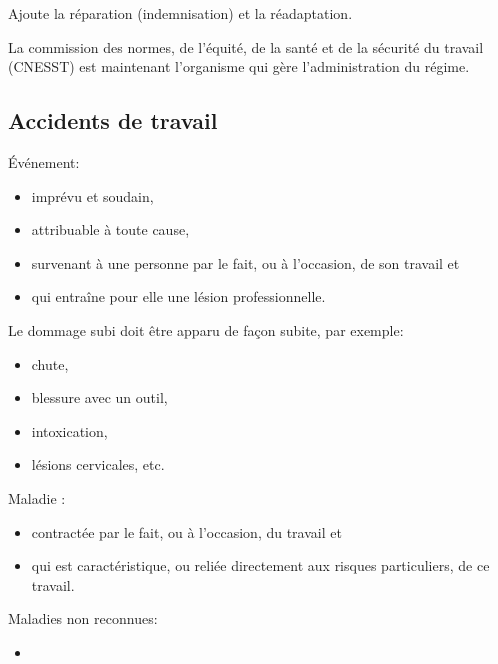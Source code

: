 \documentclass[10pt, french]{article}
\begin{document}
\begin{multicols*}{3}
\begin{rappel_enhanced}
Ajoute la réparation (indemnisation) et la réadaptation.
\end{rappel_enhanced}

La commission des normes, de l'équité, de la santé et de la sécurité du travail (CNESST) est maintenant l'organisme qui gère l'administration du régime.

\subsection*{Accidents de travail}
\begin{definitionNOHFILL}
Événement: 
\begin{itemize}[leftmargin = *]
	\item	imprévu et soudain, 
	\item	attribuable à toute cause, 
	\item	survenant à une personne par le fait, ou à l'occasion, de son travail et 
	\item	qui entraîne pour elle une lésion professionnelle.
\end{itemize}

Le dommage subi doit être apparu de façon subite, par exemple: 
\begin{itemize}[leftmargin = *]
	\item	chute,
	\item	blessure avec un outil,
	\item	intoxication,
	\item	lésions cervicales, etc.
\end{itemize}
\end{definitionNOHFILL}

\begin{definitionNOHFILL}
Maladie :
\begin{itemize}[leftmargin = *]
	\item	contractée par le fait, ou à l'occasion, du travail et 
	\item	qui est caractéristique, ou reliée directement aux risques particuliers, de ce travail.
\end{itemize}

Maladies non reconnues:
\begin{itemize}[leftmargin = *]
	\item	
\end{itemize}
\end{definitionNOHFILL}


\end{multicols*}
\end{document}
